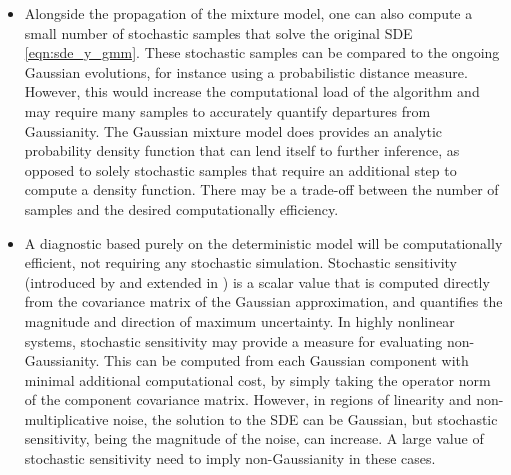 \begin{itemize}
	\item Alongside the propagation of the mixture model, one can also compute a small number of stochastic samples that solve the original SDE \cref{eqn:sde_y_gmm}.
	      These stochastic samples can be compared to the ongoing Gaussian evolutions, for instance using a probabilistic distance measure.
	      However, this would increase the computational load of the algorithm and may require many samples to accurately quantify departures from Gaussianity.
	      The Gaussian mixture model does provides an analytic probability density function that can lend itself to further inference, as opposed to solely stochastic samples that require an additional step to compute a density function.
	      There may be a trade-off between the number of samples and the desired computationally efficiency.

	\item A diagnostic based purely on the deterministic model will be computationally efficient, not requiring any stochastic simulation.
	      Stochastic sensitivity (introduced by \citet{Balasuriya_2020_StochasticSensitivityComputable} and extended in ) is a scalar value that is computed directly from the covariance matrix of the Gaussian approximation, and quantifies the magnitude and direction of maximum uncertainty.
	      In highly nonlinear systems, stochastic sensitivity may provide a measure for evaluating non-Gaussianity.
	      This can be computed from each Gaussian component with minimal additional computational cost, by simply taking the operator norm of the component covariance matrix.
	      However, in regions of linearity and non-multiplicative noise, the solution to the SDE can be Gaussian, but stochastic sensitivity, being the magnitude of the noise, can increase.
	      A large value of stochastic sensitivity need to imply non-Gaussianity in these cases.



\end{itemize}
